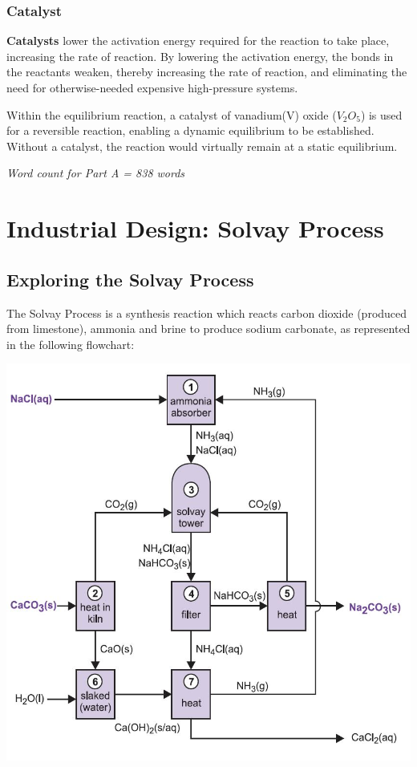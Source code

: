 \documentclass[12pt, a4paper]{article}
\begin{document}
\subsubsection{Catalyst}

\textbf{Catalysts} lower the activation energy required for the reaction to take place, increasing the rate of reaction. By lowering the activation energy, the bonds in the reactants weaken, thereby increasing the rate of reaction, and eliminating the need for otherwise-needed expensive high-pressure systems. 

Within the equilibrium reaction, a catalyst of vanadium(V) oxide (\(V_{2}O_{5}\)) is used for a reversible reaction, enabling a dynamic equilibrium to be established. Without a catalyst, the reaction would virtually remain at a static equilibrium.

\emph{Word count for Part A = 838 words}


\section{Industrial Design: Solvay Process}

\subsection{Exploring the Solvay Process}

The Solvay Process is a synthesis reaction which reacts carbon dioxide (produced from limestone), ammonia and brine to produce sodium carbonate, as represented in the following flowchart:

\begin{center}
\includegraphics[scale=0.6]{solvay.jpeg}
\\
\end{center}
\end{document}
